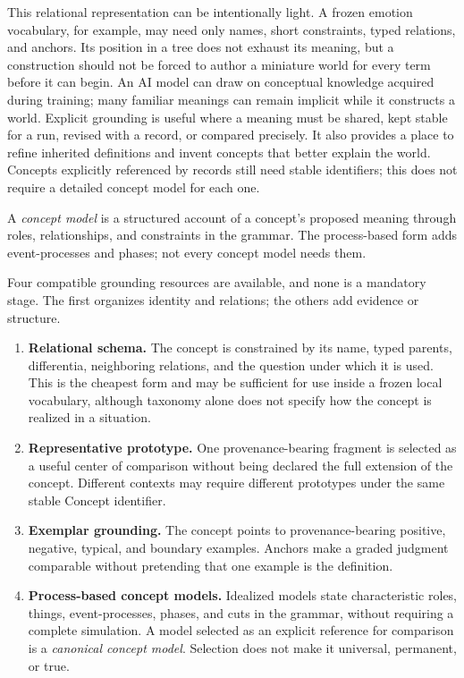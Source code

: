 \documentclass[11pt,a4paper]{article}
\begin{document}
This relational representation can be intentionally light. A frozen emotion
vocabulary, for example, may need only names, short constraints, typed
relations, and anchors. Its position in a tree does not exhaust its
meaning, but a construction should not be forced to author a miniature world
for every term before it can begin. An AI model can draw on conceptual knowledge
acquired during training; many familiar meanings can remain implicit while it
constructs a world. Explicit grounding is useful where a meaning must be shared,
kept stable for a run, revised with a record, or compared precisely. It also
provides a place to refine inherited definitions and invent concepts that better
explain the world. Concepts explicitly referenced by records still need stable
identifiers; this does not require a detailed concept model for each one.

A \emph{concept model} is a structured account of a concept's proposed meaning
through roles, relationships, and constraints in the grammar. The process-based
form adds event-processes and phases; not every concept model needs them.

Four compatible grounding resources are available, and none is a mandatory
stage. The first organizes identity and relations; the others add evidence or
structure.

\begin{enumerate}
  \item \textbf{Relational schema.} The concept is constrained by its name,
    typed parents, differentia, neighboring relations, and the question under
    which it is used. This is the cheapest form and may be sufficient for use
    inside a frozen local vocabulary, although taxonomy alone does not specify
    how the concept is realized in a situation.
  \item \textbf{Representative prototype.} One provenance-bearing fragment is
    selected as a useful center of comparison without being declared the full
    extension of the concept. Different contexts may require different
    prototypes under the same stable Concept identifier.
  \item \textbf{Exemplar grounding.} The concept points to provenance-bearing
    positive, negative, typical, and boundary examples. Anchors make a graded
    judgment comparable without pretending that one example is the definition.
  \item \textbf{Process-based concept models.} Idealized models state characteristic
    roles, things, event-processes, phases, and cuts in the grammar, without
    requiring a complete simulation. A model
    selected as an explicit reference for comparison is a \emph{canonical
    concept model}. Selection does not make it universal, permanent, or true.
\end{enumerate}
\end{document}
